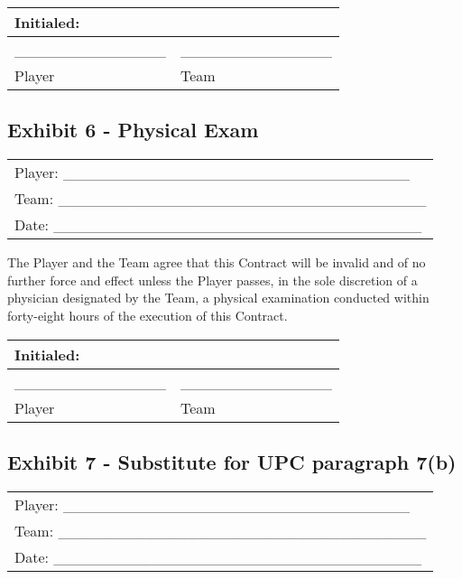 \documentclass[
]{book}
\begin{document}
\begin{longtable}[]{@{}ll@{}}
\toprule()
Initialed: & \\
\midrule()
\endhead
\_\_\_\_\_\_\_\_\_\_\_\_\_\_ & \_\_\_\_\_\_\_\_\_\_\_\_\_\_ \\
Player & Team \\
\bottomrule()
\end{longtable}

\newpage

\hypertarget{exhibit-6---physical-exam}{%
\subsection{Exhibit 6 - Physical Exam}\label{exhibit-6---physical-exam}}

\begin{longtable}[]{@{}l@{}}
\toprule()
\endhead
Player: \_\_\_\_\_\_\_\_\_\_\_\_\_\_\_\_\_\_\_\_\_\_\_\_\_\_\_\_\_\_\_\_ \\
Team: \_\_\_\_\_\_\_\_\_\_\_\_\_\_\_\_\_\_\_\_\_\_\_\_\_\_\_\_\_\_\_\_\_\_ \\
Date: \_\_\_\_\_\_\_\_\_\_\_\_\_\_\_\_\_\_\_\_\_\_\_\_\_\_\_\_\_\_\_\_\_\_ \\
\bottomrule()
\end{longtable}

The Player and the Team agree that this Contract will be invalid and of no further force and effect unless the Player passes, in the sole discretion of a physician designated by the Team, a physical examination conducted within forty-eight hours of the execution of this Contract.

\begin{longtable}[]{@{}ll@{}}
\toprule()
Initialed: & \\
\midrule()
\endhead
\_\_\_\_\_\_\_\_\_\_\_\_\_\_ & \_\_\_\_\_\_\_\_\_\_\_\_\_\_ \\
Player & Team \\
\bottomrule()
\end{longtable}

\newpage

\hypertarget{exhibit-7---substitute-for-upc-paragraph-7b}{%
\subsection{Exhibit 7 - Substitute for UPC paragraph 7(b)}\label{exhibit-7---substitute-for-upc-paragraph-7b}}

\begin{longtable}[]{@{}l@{}}
\toprule()
\endhead
Player: \_\_\_\_\_\_\_\_\_\_\_\_\_\_\_\_\_\_\_\_\_\_\_\_\_\_\_\_\_\_\_\_ \\
Team: \_\_\_\_\_\_\_\_\_\_\_\_\_\_\_\_\_\_\_\_\_\_\_\_\_\_\_\_\_\_\_\_\_\_ \\
Date: \_\_\_\_\_\_\_\_\_\_\_\_\_\_\_\_\_\_\_\_\_\_\_\_\_\_\_\_\_\_\_\_\_\_ \\
\bottomrule()
\end{longtable}
\end{document}
